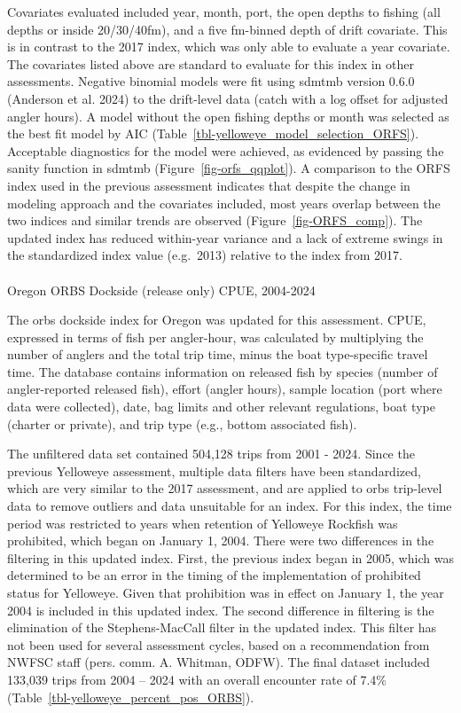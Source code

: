 \documentclass[
]{scrartcl}
\makeatletter
\let\oldparagraph\paragraph
\renewcommand{\paragraph}{
    \@ifstar
      \xxxParagraphStar
      \xxxParagraphNoStar
  }
\newcommand{\xxxParagraphStar}[1]{\oldparagraph*{#1}\mbox{}}
\newcommand{\xxxParagraphNoStar}[1]{\oldparagraph{#1}\mbox{}}
\makeatother
\begin{document}
Covariates evaluated included year, month, port, the open depths to
fishing (all depths or inside 20/30/40fm), and a five fm-binned depth of
drift covariate. This is in contrast to the 2017 index, which was only
able to evaluate a year covariate. The covariates listed above are
standard to evaluate for this index in other assessments. Negative
binomial models were fit using \gls{sdmtmb} version 0.6.0 (Anderson et
al. 2024) to the drift-level data (catch with a log offset for adjusted
angler hours). A model without the open fishing depths or month was
selected as the best fit model by AIC
(Table~\ref{tbl-yelloweye_model_selection_ORFS}). Acceptable diagnostics
for the model were achieved, as evidenced by passing the sanity function
in \gls{sdmtmb} (Figure~\ref{fig-orfs_qqplot}). A comparison to the ORFS
index used in the previous assessment indicates that despite the change
in modeling approach and the covariates included, most years overlap
between the two indices and similar trends are observed
(Figure~\ref{fig-ORFS_comp}). The updated index has reduced within-year
variance and a lack of extreme swings in the standardized index value
(e.g.~2013) relative to the index from 2017.

\paragraph{Oregon ORBS Dockside (release only) CPUE,
2004-2024}\label{oregon-orbs-dockside-release-only-cpue-2004-2024}

The \gls{orbs} dockside index for Oregon was updated for this
assessment. CPUE, expressed in terms of fish per angler-hour, was
calculated by multiplying the number of anglers and the total trip time,
minus the boat type-specific travel time. The database contains
information on released fish by species (number of angler-reported
released fish), effort (angler hours), sample location (port where data
were collected), date, bag limits and other relevant regulations, boat
type (charter or private), and trip type (e.g., bottom associated fish).

The unfiltered data set contained 504,128 trips from 2001 - 2024. Since
the previous Yelloweye assessment, multiple data filters have been
standardized, which are very similar to the 2017 assessment, and are
applied to \gls{orbs} trip-level data to remove outliers and data
unsuitable for an index. For this index, the time period was restricted
to years when retention of Yelloweye Rockfish was prohibited, which
began on January 1, 2004. There were two differences in the filtering in
this updated index. First, the previous index began in 2005, which was
determined to be an error in the timing of the implementation of
prohibited status for Yelloweye. Given that prohibition was in effect on
January 1, the year 2004 is included in this updated index. The second
difference in filtering is the elimination of the Stephens-MacCall
filter in the updated index. This filter has not been used for several
assessment cycles, based on a recommendation from NWFSC staff (pers.
comm. A. Whitman, ODFW). The final dataset included 133,039 trips from
2004 -- 2024 with an overall encounter rate of 7.4\%
(Table~\ref{tbl-yelloweye_percent_pos_ORBS}).
\end{document}

